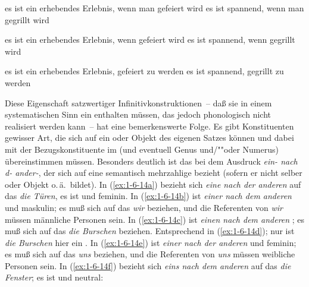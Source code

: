 \documentclass[output=paper]{langsci/langscibook}
\begin{document}
\begin{exe}
\ex\label{ex:1-6-12}
\begin{xlist}
\ex\label{ex:1-6-12i}
\begin{xlist}
\ex\label{ex:1-6-12ia} es ist ein erhebendes Erlebnis, wenn man gefeiert wird
\ex\label{ex:1-6-12ib} es ist spannend, wenn man gegrillt wird
\end{xlist}
\ex\label{ex:1-6-12ii}
\begin{xlist}
\ex\label{ex:1-6-12iia} es ist ein erhebendes Erlebnis, wenn gefeiert wird
\ex\label{ex:1-6-12iib} es ist spannend, wenn gegrillt wird
\end{xlist}
\end{xlist}
\end{exe}
\pagebreak
\begin{exe}
\ex\label{ex:1-6-13}
\begin{xlist}
\ex\label{ex:1-6-13a} es ist ein erhebendes Erlebnis, gefeiert zu werden
\ex\label{ex:1-6-13b} es ist spannend, gegrillt zu werden
\end{xlist}
\end{exe}
Diese Eigenschaft satzwertiger Infinitivkonstruktionen~-- daß sie in einem systematischen Sinn ein  enthalten müssen, das jedoch phonologisch nicht realisiert werden kann~-- hat eine bemerkenswerte Folge. Es gibt Konstituenten gewisser
Art, die sich auf ein  oder Objekt des eigenen Satzes  können und
dabei mit der Bezugskonstituente im  (und eventuell Genus und/""oder Numerus)
übereinstimmen müssen. Besonders deutlich ist das bei dem Ausdruck \textit{ein- nach d- ander-}, der sich auf eine semantisch mehrzahlige  bezieht (sofern er
nicht selber  oder Objekt o.\,ä.\ bildet). In (\ref{ex:1-6-14a}) bezieht sich \textit{eine nach der
anderen} auf das  \textit{die Türen}, es ist  und feminin. In (\ref{ex:1-6-14b}) ist \textit{einer nach dem anderen}  und maskulin; es muß sich auf das  \textit{wir}
beziehen, und die Referenten von \textit{wir} müssen männliche Personen sein. In (\ref{ex:1-6-14c}) ist
\textit{einen nach dem anderen} ; es muß sich auf das  \textit{die
Burschen} beziehen. Entsprechend in (\ref{ex:1-6-14d}); nur ist \textit{die Burschen} hier ein . In (\ref{ex:1-6-14e}) ist \textit{einer nach der anderen}  und feminin; es muß sich auf das  \textit{uns} beziehen, und die Referenten von \textit{uns} müssen weibliche Personen sein. In (\ref{ex:1-6-14f}) bezieht sich \textit{eins nach dem anderen} auf das  \textit{die Fenster}; es ist  und neutral:
\end{document}
